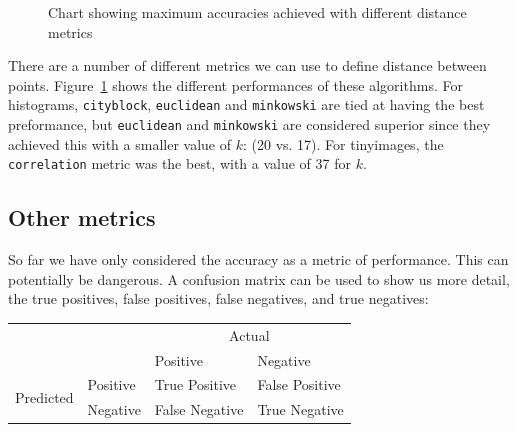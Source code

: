 \documentclass{article}
\begin{document}
\begin{multicols}{2}
\begin{figure}[H]
	\begin{center}
	\end{center}
	\caption{Chart showing maximum accuracies achieved with different distance metrics}
	\label{fig:distancemetrics}
\end{figure}

There are a number of different metrics we can use to define distance between points. Figure~\ref{fig:distancemetrics} shows the different performances of these algorithms. For histograms, \texttt{cityblock}, \texttt{euclidean} and \texttt{minkowski} are tied at having the best preformance, but \texttt{euclidean} and \texttt{minkowski} are considered superior since they achieved this with a smaller value of $k$: (20 vs. 17). For tinyimages, the \texttt{correlation} metric was the best, with a value of 37 for $k$.

\subsection{Other metrics}
So far we have only considered the accuracy as a metric of performance. This can potentially be dangerous. A confusion matrix can be used to show us more detail, the true positives, false positives, false negatives, and true negatives:

\begin{table}[H]
	\begin{center}
		\begin{tabular}{ll|ll}
			                           &          & \multicolumn{2}{c}{Actual}      \\
			                           &          & Positive       & Negative       \\
			\midrule 
			\multirow{2}{*}{Predicted} & Positive & True Positive  & False Positive \\
			                           & Negative & False Negative & True Negative  \\
		\end{tabular}
	\end{center}
\end{table}


\end{multicols}
\end{document}
